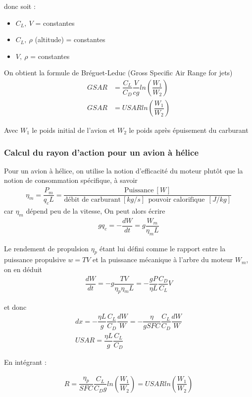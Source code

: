 \documentclass{report}
\begin{document}
donc soit :
\begin{itemize}
    \item $C_L,~V$ = constantes
    \item $C_L,~\rho$ (altitude) = constantes
    \item $V,~\rho$ = constantes
\end{itemize}


On obtient la formule de Bréguet-Leduc (Gross Specific Air Range for jets)
\begin{eqnarray}
GSAR &= \dfrac{C_L}{C_D}\dfrac{V}{c g} ln(\dfrac{W_1}{W_2})\\
GSAR &= USAR ln(\dfrac{W_1}{W_2})
\end{eqnarray}

Avec $W_1$ le poids initial de l'avion et $W_2$ le poids après épuisement du carburant

\subsubsection{Calcul du rayon d'action pour un avion à hélice}

Pour un avion à hélice, on utilise la notion d’efficacité du moteur plutôt que la notion de consommation spécifique, à savoir
\begin{eqnarray}
\eta_m = \dfrac{P_m}{q_c L}=\dfrac{\text{Puissance}~[W]}{\text{débit de carburant}~[kg/s]~~\text{pouvoir calorifique}~~[J/kg]}
\end{eqnarray}
car $\eta_m$ dépend peu de la vitesse, On peut alors écrire
\begin{eqnarray}
g q_c = -\dfrac{dW}{dt}=g\dfrac{W_m}{\eta_m L}
\end{eqnarray}

Le rendement de propulsion $\eta_p$ étant lui défini comme le rapport entre la puissance propulsive $w=TV$ et la puissance mécanique à l'arbre du moteur $W_m$, on en déduit
\begin{eqnarray}
\dfrac{dW}{dt}=-g\dfrac{TV}{\eta_p\eta_m L}=-\dfrac{gP}{\eta L}\dfrac{C_D}{C_L}V
\end{eqnarray}

et donc
\begin{eqnarray}
dx=-\dfrac{\eta L}{g}\dfrac{C_L}{C_D}\dfrac{dW}{W} = -\dfrac{\eta}{gSFC}\dfrac{C_L}{C_D}\dfrac{dW}{W} \\
USAR = \dfrac{\eta L}{g}\dfrac{C_L}{C_D}
\end{eqnarray}

En intégrant :

\begin{eqnarray}
R= \dfrac{\eta_p}{SFC}\dfrac{C_L}{C_D g}ln(\dfrac{W_1}{W_2})=USAR ln(\dfrac{W_1}{W_2})
\end{eqnarray}
\end{document}
